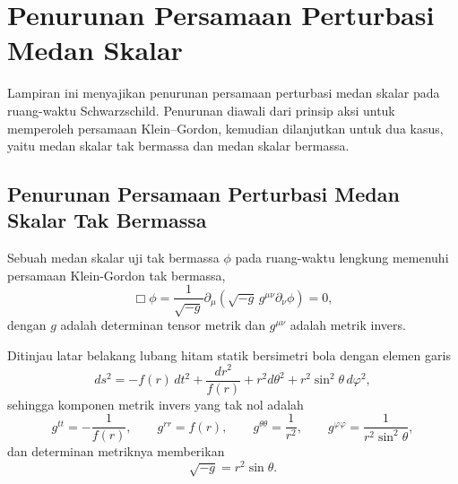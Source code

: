 \chapter{Penurunan Persamaan Perturbasi Medan Skalar}
\label{app:perturbasi-medan-skalar}

Lampiran ini menyajikan penurunan persamaan perturbasi medan skalar pada ruang-waktu Schwarzschild. Penurunan diawali dari prinsip aksi untuk memperoleh persamaan Klein--Gordon, kemudian dilanjutkan untuk dua kasus, yaitu medan skalar tak bermassa dan medan skalar bermassa.

\section{Penurunan Persamaan Perturbasi Medan Skalar Tak Bermassa}
\label{app:perturbasi-skalar-massless}

 
Sebuah medan skalar uji tak bermassa $\phi$ pada ruang-waktu lengkung memenuhi
persamaan Klein-Gordon tak bermassa,
\begin{equation}
    \Box \phi = \frac{1}{\sqrt{-g}} \partial_\mu \left( \sqrt{-g}\, g^{\mu\nu} \partial_\nu \phi \right) = 0,
    \label{eq:appkg-takbermassa}
\end{equation}
dengan $g$ adalah determinan tensor metrik dan $g^{\mu\nu}$ adalah metrik invers.
 
Ditinjau latar belakang lubang hitam statik bersimetri bola dengan elemen garis
\begin{equation}
    ds^2 = -f(r)\, dt^2 + \frac{dr^2}{f(r)} + r^2 d\theta^2 + r^2 \sin^2\theta\, d\varphi^2,
    \label{eq:appmetrik}
\end{equation}
sehingga komponen metrik invers yang tak nol adalah
\begin{equation}
    g^{tt} = -\frac{1}{f(r)}, \qquad g^{rr} = f(r), \qquad
    g^{\theta\theta} = \frac{1}{r^2}, \qquad g^{\varphi\varphi} = \frac{1}{r^2 \sin^2\theta},
    \label{eq:appginv}
\end{equation}
dan determinan metriknya memberikan
\begin{equation}
    \sqrt{-g} = r^2 \sin\theta.
    \label{eq:appakar-g}
\end{equation}
 
